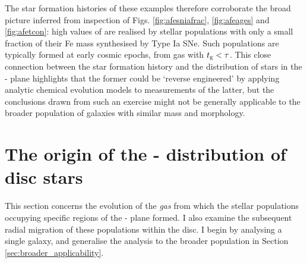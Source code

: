 The star formation histories of these examples therefore corroborate the broad picture inferred from inspection of Figs. \ref{fig:afesniafrac}, \ref{fig:afeages} and \ref{fig:afetcon}: high values of \afe{} are realised by stellar populations with only a small fraction of their Fe mass synthesised by Type Ia SNe. Such populations are typically formed at early cosmic epochs, from gas with $t_{\rm g} < \tau$. This close connection between the star formation history and the distribution of stars in the \afe{}-\feh{} plane highlights that the former could be `reverse engineered' by applying analytic chemical evolution models to measurements of the latter, but the conclusions drawn from such an exercise might not be generally applicable to the broader population of galaxies with similar mass and morphology. 

\section{The origin of the \afe{}-\feh{} distribution of disc stars}
\label{sec:afeorigin}

This section concerns the evolution of the \emph{gas} from which the stellar populations occupying specific regions of the \afe{}-\feh{} plane formed. I also examine the subsequent radial migration of these populations within the disc. I begin by analysing a single galaxy, and generalise the analysis to the broader population in Section \ref{sec:broader_applicability}.


